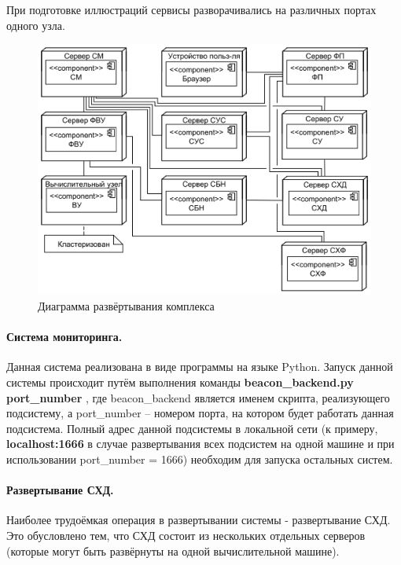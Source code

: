 \documentclass[a4paper,12pt]{report}
\numberwithin{equation}{section}
\begin{document}
  При подготовке иллюстраций сервисы разворачивались на различных портах одного узла.
  
  \begin{figure}
    \centering
    \includegraphics[width=\linewidth]{diagrams/common/deployment}
    \caption{Диаграмма развёртывания комплекса}
    \label{fig:depl-common}
  \end{figure}
  
  
  \paragraph{Система мониторинга.}
  Данная система реализована в виде программы на языке Python.
  Запуск данной системы происходит путём выполнения команды 
  \textbf{ beacon\_backend.py port\_number }
  , где beacon\_backend является именем скрипта, реализующего подсистему, 
  а port\_number -- номером порта, на котором будет работать данная подсистема.
  Полный адрес данной подсистемы в локальной сети (к примеру, 
  \textbf{localhost:1666} в случае развертывания всех подсистем на одной машине 
  и при использовании port\_number = 1666)
  необходим для запуска остальных систем.  
  
  \paragraph{Развертывание СХД.}
  Наиболее трудоёмкая операция в развертывании системы - развертывание СХД. 
  Это обусловлено тем, что СХД состоит из нескольких отдельных серверов (которые могут быть развёрнуты на одной вычислительной машине).
  
\end{document}
